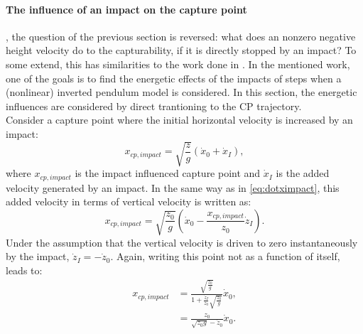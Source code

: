 \paragraph{The influence of an impact on the capture point}, the question of the previous section is reversed: what does an nonzero negative height velocity do to the capturability, if it is directly stopped by an impact? To some extend, this has similarities to the work done in \cite{kuo2005energetic}. In the mentioned work, one of the goals is to find the energetic effects of the impacts of steps when a (nonlinear) inverted pendulum model is considered. In this section, the energetic influences are considered by direct trantioning to the \ac{CP} trajectory.\\
Consider a capture point where the initial horizontal velocity is increased by an impact:
\begin{equation}
x_{cp,impact} = \sqrt{\frac{z}{g}}(\dot{x}_0+\dot{x}_I),
\end{equation}
where $x_{cp,impact}$ is the impact influenced capture point and $\dot{x}_I$ is the added velocity generated by an impact. In the same way as in \eqref{eq:dotximpact}, this added velocity in terms of vertical velocity is written as:
\begin{equation}
x_{cp,impact} = \sqrt{\frac{z_0}{g}}(\dot{x}_0-\frac{x_{cp,impact}}{z_0}\dot{z}_I). 
\end{equation}
Under the assumption that the vertical velocity is driven to zero instantaneously by the impact, $\dot{z}_I=-\dot{z}_0$. Again, writing this point not as a function of itself, leads to:
\begin{align}\label{eq:xcpimpact}
x_{cp,impact} &= \frac{\sqrt{\frac{z_0}{g}}}{1+\frac{\dot{z}_I}{z_0}\sqrt{\frac{z_0}{g}}}\dot{x}_0,\\
			&= \frac{z_0}{\sqrt{z_0g}-\dot{z}_0}\dot{x}_0.
\end{align}

